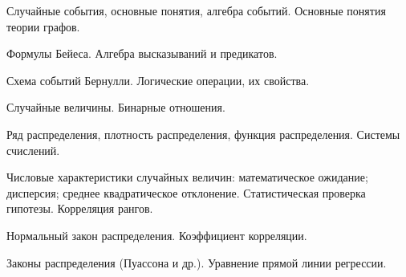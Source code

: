 \documentclass[
	14pt,
	a4paper,
	]
	{scrartcl}
\begin{document}
\shapk
{}
\setcounter{zad}{0}

\vfill
\z Случайные события, основные понятия, алгебра событий.
 \vfill
\z Основные понятия теории графов. \vfill

\vfill

\newpage


\shapk
{}
\setcounter{zad}{0}

\vfill
\z Формулы Бейеса.
 \vfill
\z Алгебра высказываний и предикатов.
 \vfill

\vfill

\newpage


\shapk
{}
\setcounter{zad}{0}

\vfill
\z Схема событий Бернулли.
 \vfill
\z Логические операции, их свойства.
 \vfill

\vfill

\newpage


\shapk
{}
\setcounter{zad}{0}

\vfill
\z Случайные величины.
 \vfill
\z Бинарные отношения.
 \vfill

\vfill

\newpage


\shapk
{}
\setcounter{zad}{0}

\vfill
\z Ряд распределения, плотность распределения, функция распределения.
 \vfill
\z Системы счислений.
 \vfill

\vfill

\newpage


\shapk
{}
\setcounter{zad}{0}

\vfill
\z Числовые характеристики случайных величин: математическое ожидание; дисперсия; 	среднее квадратическое отклонение.
 \vfill
\z Статистическая проверка гипотезы. Корреляция рангов.
 \vfill

\vfill

\newpage


\shapk
{}
\setcounter{zad}{0}

\vfill
\z Нормальный закон распределения.
 \vfill
\z Коэффициент корреляции.
 \vfill

\vfill

\newpage


\shapk
{}
\setcounter{zad}{0}

\vfill
\z Законы распределения (Пуассона и др.).
 \vfill
\z Уравнение прямой линии регрессии.
 \vfill
\end{document}
